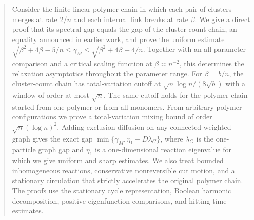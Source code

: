 \begin{abstract}
Consider the finite linear-polymer chain in which each pair of clusters
merges at rate $2/n$ and each internal link breaks at rate $\beta$.
We give a direct proof that its spectral gap equals the gap of the
cluster-count chain, an equality announced in earlier work, and prove
the uniform estimate
$\sqrt{\beta^2+4\beta}-5/n\le\gamma_M\le
\sqrt{\beta^2+4\beta}+4/n$.
Together with an all-parameter comparison and a critical scaling
function at $\beta\asymp n^{-2}$, this determines the relaxation
asymptotics throughout the parameter range. For $\beta=b/n$, the
cluster-count chain has total-variation cutoff at
$\sqrt n\log n/(8\sqrt b)$ with a window of order at most $\sqrt n$.
The same cutoff holds for the polymer chain started from one polymer
or from all monomers. From arbitrary polymer configurations we prove
a total-variation mixing bound of order $\sqrt n(\log n)^2$.
Adding exclusion diffusion on any connected
weighted graph gives the exact gap
$\min\{\gamma_M,\eta_1+D\lambda_G\}$, where $\lambda_G$ is the
one-particle graph gap and $\eta_1$ is a one-dimensional reaction
eigenvalue for which we give uniform and sharp estimates.
We also treat bounded inhomogeneous reactions, conservative
nonreversible cut motion, and a stationary circulation that strictly
accelerates the original polymer chain. The proofs use the stationary
cycle representation, Boolean harmonic decomposition, positive
eigenfunction comparisons, and hitting-time estimates.
\end{abstract}
